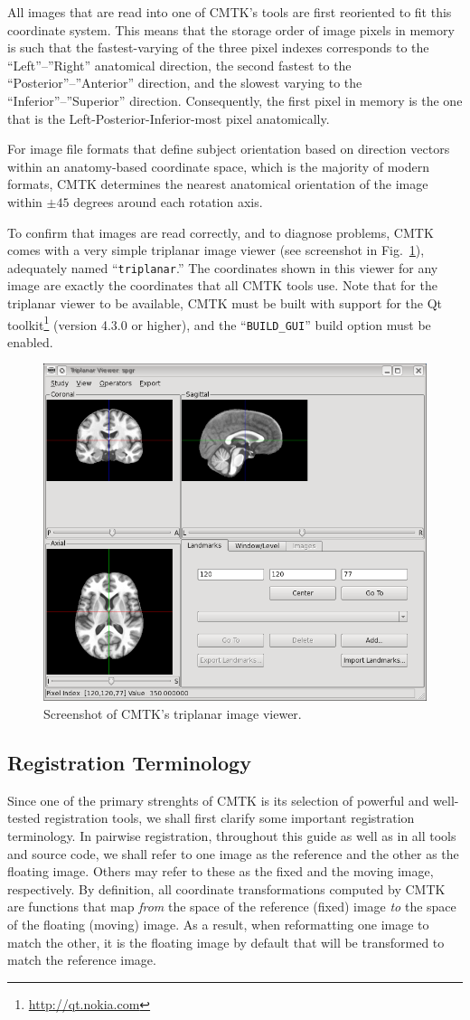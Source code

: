 \documentclass{InsightArticle}
\begin{document}
All images that are read into one of CMTK's tools are first reoriented to fit
this coordinate system. This means that the storage order of image pixels in
memory is such that the fastest-varying of the three pixel indexes corresponds
to the ``Left''--''Right'' anatomical direction, the second fastest to the
``Posterior''--''Anterior'' direction, and the slowest varying to the
``Inferior''--''Superior'' direction. Consequently, the first pixel in memory
is the one that is the Left-Posterior-Inferior-most pixel anatomically.

For image file formats that define subject orientation based on direction
vectors within an anatomy-based coordinate space, which is the majority of
modern formats, CMTK determines the nearest anatomical orientation of the
image within $\pm 45$ degrees around each rotation axis.

To confirm that images are read correctly, and to diagnose problems, CMTK
comes with a very simple triplanar image viewer (see screenshot in
Fig.~\ref{fig:triplanar}), adequately named ``\verb|triplanar|.'' The
coordinates shown in this viewer for any image are exactly the coordinates
that all CMTK tools use. Note that for the triplanar viewer to be available,
CMTK must be built with support for the Qt
toolkit\footnote{\url{http://qt.nokia.com}} (version 4.3.0 or higher), and the
``\verb|BUILD_GUI|'' build option must be enabled.

\begin{figure}[tbp]
\centerline{\includegraphics[width=.5\linewidth]{img/triplanar}}
\caption{Screenshot of CMTK's triplanar image viewer.}
\label{fig:triplanar}
\end{figure}

\subsection{Registration Terminology}

Since one of the primary strenghts of CMTK is its selection of powerful and
well-tested registration tools, we shall first clarify some important
registration terminology. In pairwise registration, throughout this guide as
well as in all tools and source code, we shall refer to one image as the
reference and the other as the floating image. Others may refer to these as
the fixed and the moving image, respectively. By definition, all coordinate
transformations computed by CMTK are functions that map {\em from\/} the space
of the reference (fixed) image {\em to\/} the space of the floating (moving)
image. As a result, when reformatting one image to match the other, it is the
floating image by default that will be transformed to match the reference
image.
\end{document}
